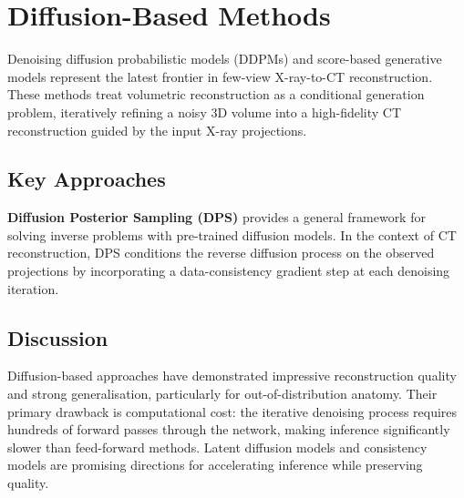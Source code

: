 
\section{Diffusion-Based Methods}
\label{sec:diffusion_methods}

Denoising diffusion probabilistic models (DDPMs) and score-based generative models represent the latest frontier in few-view X-ray-to-CT reconstruction. These methods treat volumetric reconstruction as a conditional generation problem, iteratively refining a noisy 3D volume into a high-fidelity CT reconstruction guided by the input X-ray projections.

\subsection{Key Approaches}

\textbf{Diffusion Posterior Sampling (DPS)} \cite{chung2023diffusion} provides a general framework for solving inverse problems with pre-trained diffusion models. In the context of CT reconstruction, DPS conditions the reverse diffusion process on the observed projections by incorporating a data-consistency gradient step at each denoising iteration.


\subsection{Discussion}

Diffusion-based approaches have demonstrated impressive reconstruction quality and strong generalisation, particularly for out-of-distribution anatomy. Their primary drawback is computational cost: the iterative denoising process requires hundreds of forward passes through the network, making inference significantly slower than feed-forward methods. Latent diffusion models and consistency models are promising directions for accelerating inference while preserving quality.

